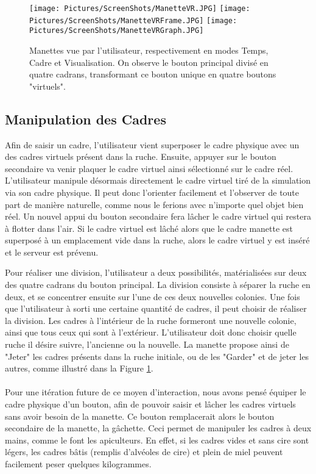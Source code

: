 		\begin{figure}
		\centering
		\texttt{[image: Pictures/ScreenShots/ManetteVR.JPG]}
		\texttt{[image: Pictures/ScreenShots/ManetteVRFrame.JPG]}
		\texttt{[image: Pictures/ScreenShots/ManetteVRGraph.JPG]}
		\caption[Manettes vue par l'utilisateur, respectivement en mode Temps, Cadre et Visualisation.]{Manettes vue par l'utilisateur, respectivement en modes Temps, Cadre et Visualisation. On observe le bouton principal divisé en quatre cadrans, transformant ce bouton unique en quatre boutons "virtuels".}
		\label{ManetteVR}
		\end{figure}
		
		\subsection{Manipulation des Cadres}		
		Afin de saisir un cadre, l'utilisateur vient superposer le cadre physique avec un des cadres virtuels présent dans la ruche. Ensuite, appuyer sur le bouton secondaire va venir plaquer le cadre virtuel ainsi sélectionné sur le cadre réel. L'utilisateur manipule désormais directement le cadre virtuel tiré de la simulation via son cadre physique. Il peut donc l'orienter facilement et l'observer de toute part de manière naturelle, comme nous le ferions avec n'importe quel objet bien réel. Un nouvel appui du bouton secondaire fera lâcher le cadre virtuel qui restera à flotter dans l'air. Si le cadre virtuel est lâché alors que le cadre manette est superposé à un emplacement vide dans la ruche, alors le cadre virtuel y est inséré et le serveur est prévenu.
		
		Pour réaliser une division, l'utilisateur a deux possibilités, matérialisées sur deux des quatre cadrans du bouton principal. La division consiste à séparer la ruche en deux, et se concentrer ensuite sur l'une de ces deux nouvelles colonies. Une fois que l'utilisateur à sorti une certaine quantité de cadres, il peut choisir de réaliser la division. Les cadres à l'intérieur de la ruche formeront une nouvelle colonie, ainsi que tous ceux qui sont à l'extérieur. L'utilisateur doit donc choisir quelle ruche il désire suivre, l'ancienne ou la nouvelle. La manette propose ainsi de "Jeter" les cadres présents dans la ruche initiale, ou de les "Garder" et de jeter les autres, comme illustré dans la Figure \ref{ManetteVR}.

		\paragraph{}		
		Pour une itération future de ce moyen d'interaction, nous avons pensé équiper le cadre physique d'un bouton, afin de pouvoir saisir et lâcher les cadres virtuels sans avoir besoin de la manette. Ce bouton remplacerait alors le bouton secondaire de la manette, la gâchette. Ceci permet de manipuler les cadres à deux mains, comme le font les apiculteurs. En effet, si les cadres vides et sans cire sont légers, les cadres bâtis (remplis d'alvéoles de cire) et plein de miel peuvent facilement peser quelques kilogrammes.
		
